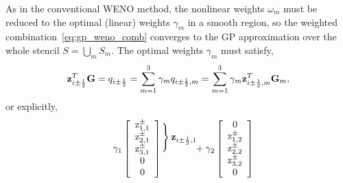 As in the conventional WENO method, the nonlinear weights \( \omega_{m} \)
must be reduced to the optimal (linear) weights \( \gamma_{m} \) in a smooth region,
so the weighted combination~\cref{eq:gp_weno_comb} converges to the GP approximation
over the whole stencil \( S = \bigcup_{m} S_{m} \). The optimal weights \( \gamma_{m} \) must satisfy,
\begin{equation}\label{eq:gp_weno_linW}
    \mathbf{z}_{i \pm \frac{1}{2}}^{T} \mathbf{G} = q_{i \pm \frac{1}{2}} = \sum_{m=1}^{3} \gamma_{m} q_{i \pm \frac{1}{2}, m} = \sum_{m=1}^{3} \gamma_{m} \mathbf{z}_{i \pm \frac{1}{2}, m}^{T} \mathbf{G}_{m},
\end{equation}
or explicitly,
\begin{equation}\label{eq:gp_weno_overdetermined}
    \gamma_{1}
    \left[
        \begin{array}{c}
            \mathrm{z}_{1,1}^{\pm} \\
            \mathrm{z}_{2,1}^{\pm} \\
            \mathrm{z}_{3,1}^{\pm} \\
            0 \\
            0 \\
        \end{array}
    \right]
    \hspace{-30.0\arrayrulewidth}
    \begin{array}[c]{@{}l@{\,}l}
       \left.
       \begin{array}{c}
           \vphantom{\vdots}\\
           \vphantom{0}
       \end{array}
       \right\}
       &
       {\bz_{i \pm \half, 1}} \\ \\ \\
    \end{array}
    \hspace{-20.0\arrayrulewidth}
+
    \gamma_{2}
    \left[
        \begin{array}{c}
            0 \\
            \mathrm{z}_{1,2}^{\pm} \\
            \mathrm{z}_{2,2}^{\pm} \\
            \mathrm{z}_{3,2}^{\pm} \\
            0 \\
        \end{array}
    \right]
    \hspace{-30.0\arrayrulewidth}
    \begin{array}[c]{@{}l@{\,}l}

\end{array}
\end{equation}
